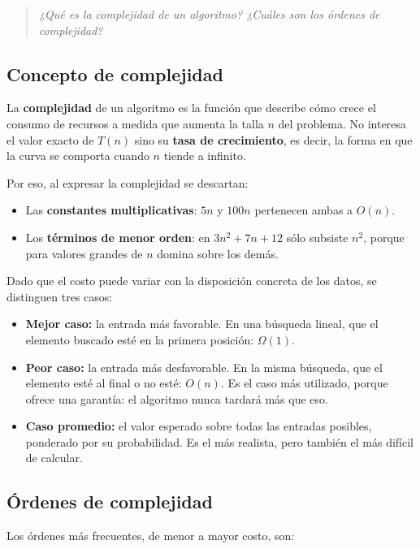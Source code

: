 \documentclass[12pt]{article}
\newcommand{\enunciado}[1]{%
    \begin{quote}
        \itshape #1
    \end{quote}
}
\begin{document}
\enunciado{¿Qué es la complejidad de un algoritmo? ¿Cuáles son los órdenes de complejidad?}

\subsection{Concepto de complejidad}

La \textbf{complejidad} de un algoritmo es la función que describe cómo crece el consumo de recursos a medida que aumenta la talla $n$ del problema. No interesa el valor exacto de $T(n)$ sino su \textbf{tasa de crecimiento}, es decir, la forma en que la curva se comporta cuando $n$ tiende a infinito.

Por eso, al expresar la complejidad se descartan:

\begin{itemize}[leftmargin=2em]
    \item Las \textbf{constantes multiplicativas}: $5n$ y $100n$ pertenecen ambas a $O(n)$.
    \item Los \textbf{términos de menor orden}: en $3n^2 + 7n + 12$ sólo subsiste $n^2$, porque para valores grandes de $n$ domina sobre los demás.
\end{itemize}

Dado que el costo puede variar con la disposición concreta de los datos, se distinguen tres casos:

\begin{itemize}[leftmargin=2em]
    \item \textbf{Mejor caso:} la entrada más favorable. En una búsqueda lineal, que el elemento buscado esté en la primera posición: $\Omega(1)$.
    \item \textbf{Peor caso:} la entrada más desfavorable. En la misma búsqueda, que el elemento esté al final o no esté: $O(n)$. Es el caso más utilizado, porque ofrece una garantía: el algoritmo nunca tardará más que eso.
    \item \textbf{Caso promedio:} el valor esperado sobre todas las entradas posibles, ponderado por su probabilidad. Es el más realista, pero también el más difícil de calcular.
\end{itemize}

\subsection{Órdenes de complejidad}

Los órdenes más frecuentes, de menor a mayor costo, son:
\end{document}
